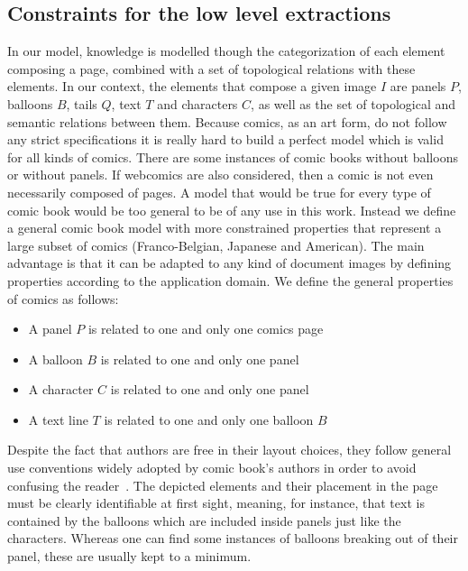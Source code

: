 
\subsection{Constraints for the low level extractions} %
\label{sec:kn:constrains_low_level_extraction}

In our model, knowledge is modelled though the categorization of each element composing a page, combined with a set of topological relations with these elements.
In our context, the elements that compose a given image $I$ are panels $P$, balloons $B$, tails $Q$, text $T$ and characters $C$, as well as the set of topological and semantic relations between them.
Because comics, as an art form, do not follow any strict specifications it is really hard to build a perfect model which is valid for all kinds of comics.
There are some instances of comic books without balloons or without panels.
If webcomics are also considered, then a comic is not even necessarily composed of pages.
A model that would be true for every type of comic book would be too general to be of any use in this work.
Instead we define a general comic book model with more constrained properties that represent a large subset of comics (Franco-Belgian, Japanese and American).
The main advantage is that it can be adapted to any kind of document images by defining properties according to the application domain.
We define the general properties of comics as follows:

\begin{itemize}
  \item A panel $P$ is related to one and only one comics page
  \item A balloon $B$ is related to one and only one panel
  \item A character $C$ is related to one and only one panel
  \item A text line $T$ is related to one and only one balloon $B$
\end{itemize}

Despite the fact that authors are free in their layout choices, they follow general use conventions widely adopted by comic book's authors in order to avoid confusing the reader~\cite{Laine2010,duc1997art}.
The depicted elements and their placement in the page must be clearly identifiable at first sight, meaning, for instance, that text is contained by the balloons which are included inside panels just like the characters.
Whereas one can find some instances of balloons breaking out of their panel, these are usually kept to a minimum.

